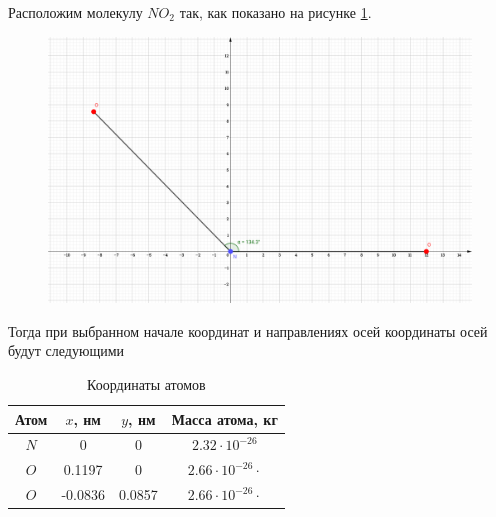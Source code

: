 Расположим молекулу $NO_2$ так, как показано на рисунке \ref{fig:geogebra-export}. 
\begin{figure}
	\centering
	\includegraphics[width=0.7\linewidth]{geogebra-export}
	\caption{}
	\label{fig:geogebra-export}
\end{figure}

Тогда при выбранном начале координат и направлениях осей координаты осей будут следующими
\begin{table}[h!]
	\centering
	\caption{Координаты атомов}
	\label{tab3}
	\setlength{\extrarowheight}{1mm}
	\begin{tabular}{|c|c|c|c|}
		\hline 
		Атом & $x$, нм & $y$, нм & Масса атома, кг \\ 
		\hline 
		$N$ & 0 & 0 & $2.32\cdot10^{-26}$ \\ 
		\hline 
		$O$ & 0.1197 & 0 & $2.66\cdot10^{-26}\cdot$ \\ 
		\hline 
		$O$ & -0.0836 & 0.0857 & $2.66\cdot10^{-26}\cdot$ \\ 
		\hline 
	\end{tabular} 
\end{table}

